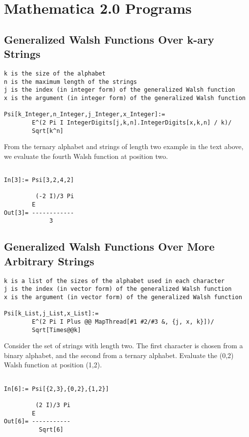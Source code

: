 \typeout{}

\chapter{{Mathematica 2.0\/} Programs}


\section{Generalized Walsh Functions Over k-ary Strings}
\begin{verbatim}
k is the size of the alphabet
n is the maximum length of the strings
j is the index (in integer form) of the generalized Walsh function
x is the argument (in integer form) of the generalized Walsh function

Psi[k_Integer,n_Integer,j_Integer,x_Integer]:=
        E^(2 Pi I IntegerDigits[j,k,n].IntegerDigits[x,k,n] / k)/
        Sqrt[k^n]

\end{verbatim}
\begin{example}
From the ternary alphabet and strings of length two example in the
text above, we evaluate the fourth Walsh function at position two.
\end{example}
\begin{verbatim}

In[3]:= Psi[3,2,4,2]

         (-2 I)/3 Pi
        E
Out[3]= ------------
             3

\end{verbatim}

\section{Generalized Walsh Functions Over More Arbitrary Strings}
\begin{verbatim}
k is a list of the sizes of the alphabet used in each character
j is the index (in vector form) of the generalized Walsh function
x is the argument (in vector form) of the generalized Walsh function

Psi[k_List,j_List,x_List]:=
        E^(2 Pi I Plus @@ MapThread[#1 #2/#3 &, {j, x, k}])/
        Sqrt[Times@@k]

\end{verbatim}
\begin{example}
Consider the set of strings with length two.  The first character
is chosen from a binary alphabet, and the second from a ternary alphabet.
Evaluate the (0,2) Walsh function at position (1,2).
\end{example}
\begin{verbatim}

In[6]:= Psi[{2,3},{0,2},{1,2}]

         (2 I)/3 Pi
        E
Out[6]= -----------
          Sqrt[6]

\end{verbatim}
